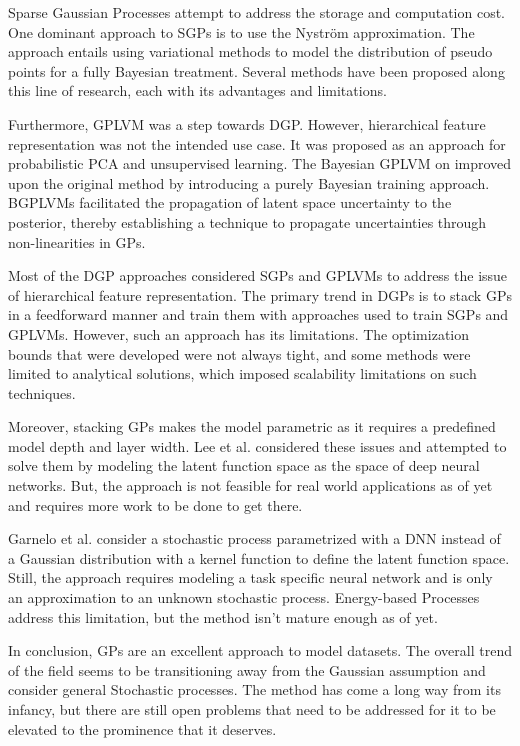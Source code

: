 \documentclass[letterpaper,11pt]{extarticle}
\begin{document}
Sparse Gaussian Processes attempt to address the storage and computation cost. One dominant approach to SGPs is to use the Nyström approximation. The approach entails using variational methods to model the distribution of pseudo points for a fully Bayesian treatment. Several methods have been proposed along this line of research, each with its advantages and limitations. 

Furthermore, GPLVM was a step towards DGP. However, hierarchical feature representation was not the intended use case. It was proposed as an approach for probabilistic PCA and unsupervised learning. The Bayesian GPLVM on improved upon the original method by introducing a purely Bayesian training approach. BGPLVMs facilitated the propagation of latent space uncertainty to the posterior, thereby establishing a technique to propagate uncertainties through non-linearities in GPs.

Most of the DGP approaches considered SGPs and GPLVMs to address the issue of hierarchical feature representation. The primary trend in DGPs is to stack GPs in a feedforward manner and train them with approaches used to train SGPs and GPLVMs. However, such an approach has its limitations. The optimization bounds that were developed were not always tight, and some methods were limited to analytical solutions, which imposed scalability limitations on such techniques. 

Moreover, stacking GPs makes the model parametric as it requires a predefined model depth and layer width. Lee et al. \cite{LeeBNSPD18} considered these issues and attempted to solve them by modeling the latent function space as the space of deep neural networks. But, the approach is not feasible for real world applications as of yet and requires more work to be done to get there.

Garnelo et al. \cite{GarneloSRVRET18} consider a stochastic process parametrized with a DNN instead of a Gaussian distribution with a kernel function to define the latent function space. Still, the approach requires modeling a task specific neural network and is only an approximation to an unknown stochastic process.  Energy-based Processes address this limitation, but the method isn't mature enough as of yet. 

In conclusion, GPs are an excellent approach to model datasets. The overall trend of the field seems to be transitioning away from the Gaussian assumption and consider general Stochastic processes. The method has come a long way from its infancy, but there are still open problems that need to be addressed for it to be elevated to the prominence that it deserves. 



\end{document}
